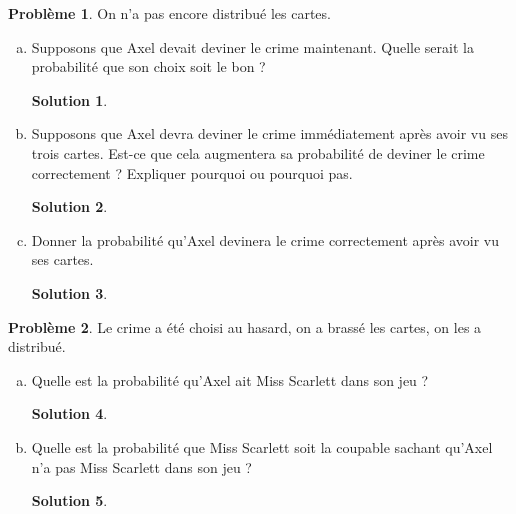 \documentclass[11pt]{amsart}
\theoremstyle{definition}
\newtheorem{probleme}{Problème}
\newtheorem*{solution}{Solution}
\theoremstyle{remark}
\numberwithin{equation}{section}
\newcommand \1 {\mathbbm 1}
\begin{document}
	\begin{probleme} On n'a pas encore distribué les cartes.
	\begin{enumerate}[(a)]
		\item Supposons que Axel devait deviner le crime maintenant. 
		Quelle serait la probabilité que son choix soit le bon ?
		
		\begin{solution}
		\end{solution}
		\vspace{0.3cm}
		
		\item Supposons que Axel devra deviner le crime immédiatement
		après avoir vu ses trois cartes. Est-ce que cela augmentera
		sa probabilité de deviner le crime correctement ? Expliquer pourquoi ou pourquoi pas.
		
		\begin{solution}
		\end{solution}
		\vspace{0.3cm}
		
		
		\item Donner la probabilité qu'Axel devinera le crime correctement
		après avoir vu ses cartes.
		
		\begin{solution}
		\end{solution}
		\vspace{0.3cm}
		
		
	\end{enumerate}
	\end{probleme}
	\vspace{0.5cm}
	
	\begin{probleme}
		Le crime a été choisi au hasard, on a brassé les cartes, on les a distribué.
		\begin{enumerate}[(a)]
			\item Quelle est la probabilité qu'Axel ait Miss Scarlett dans son jeu ?
		
		\begin{solution}
		\end{solution}
		\vspace{0.3cm}
		
			
			\item Quelle est la probabilité que Miss Scarlett soit la coupable
			sachant qu'Axel n'a pas Miss Scarlett dans son jeu ?
		
		\begin{solution}
		\end{solution}
		\vspace{0.3cm}
		
			
		\end{enumerate}
	\end{probleme}
	\newpage
	
\end{document}
